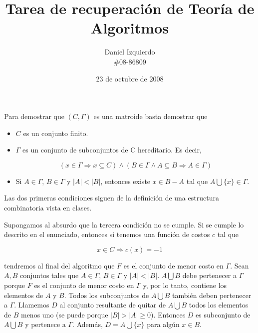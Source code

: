 \documentclass{article}
\begin{document}

\title{Tarea de recuperación de Teoría de Algoritmos}
\author{Daniel Izquierdo \\ \#08-86809}
\date{23 de octubre de 2008}

\maketitle


Para demostrar que $(C,\Gamma)$ es una matroide basta demostrar que

\begin{itemize}
 \item $C$ es un conjunto finito.
 \item $\Gamma$ es un conjunto de subconjuntos de C hereditario. Es decir,
 
 $$
 (x \in \Gamma \Rightarrow x \subseteq C) \wedge (B \in \Gamma \wedge A \subseteq B \Rightarrow A \in \Gamma)
 $$

 \item Si $A \in \Gamma$, $B \in \Gamma$ y $|A| < |B|$, entonces existe $x \in B - A$ tal que
 $A \bigcup \{x\} \in \Gamma$.
\end{itemize}

Las dos primeras condiciones siguen de la definición de una estructura combinatoria
vista en clases. %


Supongamos al absurdo que la tercera condición no se cumple.
Si se cumple lo descrito en el enunciado, entonces si tenemos una función de costos $c$ tal que

$$
x \in C \Rightarrow c(x) = -1
$$

tendremos al final del algoritmo que $F$ es el conjunto de menor costo en $\Gamma$.
Sean $A, B$ conjuntos tales que $A \in \Gamma$, $B \in \Gamma$ y $|A| < |B|$.
$A \bigcup B$ debe pertenecer
a $\Gamma$ porque $F$ es el conjunto de menor costo en $\Gamma$ y, por lo tanto, contiene
los elementos de $A$ y $B$.
Todos los subconjuntos de $A \bigcup B$ también deben pertenecer a $\Gamma$. Llamemos $D$ al conjunto resultante de
quitar de $A \bigcup B$ todos los elementos de $B$ menos uno (se puede porque $|B| > |A| \geq 0$). Entonces $D$ es subconjunto
de $A \bigcup B$ y pertenece a $\Gamma$. Además, $D = A \bigcup \{x\}$ para algún $x \in B$.
\end{document}
